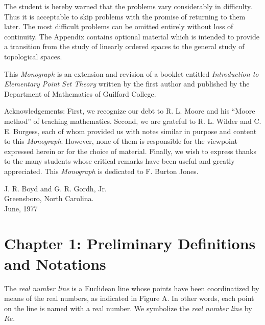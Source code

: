 \documentclass{book}
\begin{document}
The student is hereby warned that the problems vary considerably in difficulty. Thus it is acceptable to skip problems with the promise of returning to them later. The most difficult problems can be omitted entirely without loss of continuity. The Appendix contains optional material which is intended to provide a transition from the study of linearly ordered spaces to the general study of topological spaces.

This \emph{Monograph} is an extension and revision of a booklet entitled \emph{Introduction to Elementary Point Set Theory} written by the first author and published by the Department of Mathematics of Guilford College.

Acknowledgements: First, we recognize our debt to R. L. Moore and his ``Moore method'' of teaching mathematics. Second, we are grateful to R. L. Wilder and C. E. Burgess, each of whom provided us with notes similar in purpose and content to this \emph{Monograph}. However, none of them is responsible for the viewpoint expressed herein or for the choice of material. Finally, we wish to express thanks to the many students whose critical remarks have been useful and greatly appreciated. This \emph{Monograph} is dedicated to F. Burton Jones.

\begin{flushright}
J. R. Boyd and G. R. Gordh, Jr. \\
Greensboro, North Carolina. \\
June, 1977
\end{flushright}



\chapter*{Chapter 1: Preliminary Definitions and Notations}


The \emph{real number line} is a Euclidean line whose points have been coordinatized by means of the real numbers, as indicated in Figure A. In other words, each point on the line is named with a real number. We symbolize the \emph{real number line} by $Re$.
\end{document}
